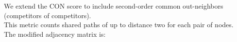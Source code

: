\documentclass[preview]{standalone}
\begin{document}
We extend the CON score to include second-order common out-neighbors (competitors of competitors).\\This metric counts shared paths of up to distance two for each pair of nodes.\\The modified adjacency matrix is:\\
\end{document}

